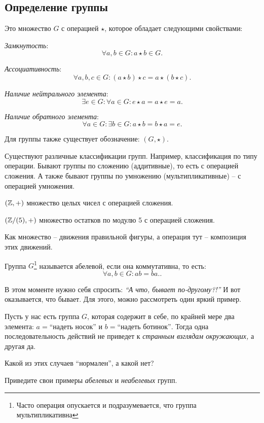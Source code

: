 \subsection{Определение группы}

\begin{definition}
    [Группа]
    Это множество $G$ с операцией $\star$, которое обладает следующими свойствами: 
    \begin{conditions}
        \item \textit{Замкнутость}: $$\forall a, b \in G: a \star b \in G.$$
        \item \textit{Ассоциативность}: $$\forall a, b, c \in G: (a \star b) \star c = a \star (b \star c).$$
        \item \textit{Наличие нейтрального элемента}: $$\exists e \in G: \forall a \in G: e \star a = a \star e = a.$$
        \item \textit{Наличие обратного элемента}: $$\forall a \in G: \exists b \in G: a \star b = b \star a = e.$$
    \end{conditions}
    Для группы также существует обозначение: $(G, \star).$
\end{definition}

Существуют различные классификации групп. Например, классификация по типу операции. 
Бывают группы по сложению (аддитивные), то есть с операцией сложения. 
А также бывают группы по умножению (мультипликативные) -- с операцией умножения.

\begin{example}
        $(\mathbb Z, +)$ множество целых чисел с операцией сложения.
\end{example}
\begin{example}
    $({\mathbb Z}/{(5)}, +)$ множество остатков по модулю 5 с операцией сложения.
\end{example}
\begin{example}
    Как множество -- движения правильной фигуры, а операция тут -- композиция этих движений.
\end{example}

\begin{definition}
    Группа $G$\footnote{Часто операция опускается и подразумевается, что группа мультипликативна} 
    называется абелевой, если она коммутативна, то есть: \[
        \forall a, b \in G: ab = ba.
    .\] 
\end{definition}

В этом моменте нужно себя спросить: \emph{``А что, бывает по-другому?!''} И вот оказывается, что бывает.
Для этого, можно рассмотреть один яркий пример. 
\begin{example}
    Пусть у нас есть группа $G$, которая содержит в себе, по крайней мере два элемента: 
    $a = \text{``надеть носок''}$ и $b = \text{``надеть ботинок''}$.
    Тогда одна последовательность действий не приведет к \emph{странным взглядам окружающих,} а другая да.
\end{example}

\begin{practice}
   Какой из этих случаев ``нормален'', а какой нет? 
\end{practice}
\begin{practice}
    Приведите свои примеры \emph{абелевых} и \emph{неабелевых} групп. 
\end{practice}
